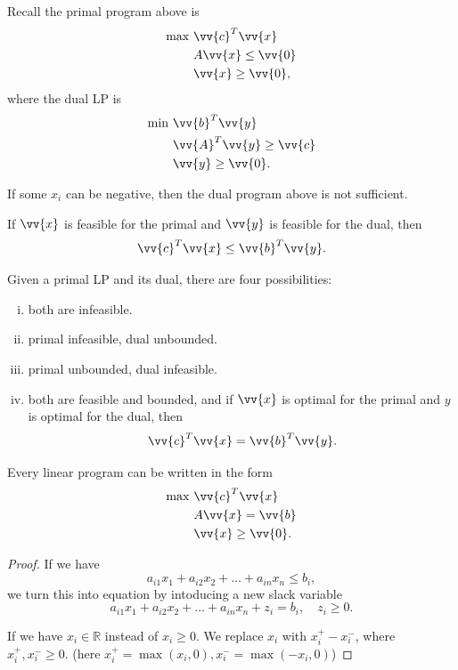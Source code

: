 
Recall the primal program above is 
\[
    \begin{aligned}
        \max~ & \vv{c}^T \vv{x}  \\
            & A \vv{x} \le \vv{0}  \\
            & \vv{x} \ge \vv{0},
    \end{aligned}
\]
where the dual LP is 
\[
    \begin{aligned}
        \min~ & \vv{b}^T \vv{y}  \\
            & \vv{A}^T \vv{y} \ge \vv{c}  \\
            & \vv{y} \ge \vv{0}.
    \end{aligned}
\]

\begin{remark}
    If some \(x_i\) can be negative, then the dual program above is not sufficient. 
\end{remark}

\begin{lemma}
    If \(\vv{x}\) is feasible for the primal and \(\vv{y}\) is feasible for the dual, then 
    \[
        \vv{c}^T \vv{x} \le \vv{b}^T \vv{y}.
    \]  
\end{lemma}

\begin{theorem}
    Given a primal LP and its dual, there are four possibilities:
    \begin{enumerate}[(i)]
        \item both are infeasible. 
        \item primal infeasible, dual unbounded. 
        \item primal unbounded, dual infeasible. 
        \item both are feasible and bounded, and if \(\vv{x}\) is optimal for the primal and \(y\) is optimal for the dual, then 
        \[
            \vv{c}^T \vv{x} = \vv{b}^T \vv{y}.
        \]
    \end{enumerate}
\end{theorem}

\begin{theorem}
    Every linear program can be written in the form 
    \[
        \begin{aligned}
            \max~ & \vv{c}^T \vv{x}  \\
                & A \vv{x} = \vv{b}  \\
                & \vv{x} \ge \vv{0}.
        \end{aligned}
    \]
\end{theorem}
\begin{proof}
    If we have 
    \[
        a_{i1} x_1 + a_{i2} x_2 + \dots + a_{in} x_n \le b_i,
    \]
    we turn this into equation by intoducing a new slack variable 
    \[
        a_{i1} x_1 + a_{i2} x_2 + \dots + a_{in} x_n + z_i = b_i, \quad z_i \ge 0.
    \]

    If we have \(x_i \in \mathbb{R}\) instead of \(x_i \ge 0\). We replace \(x_i\) with \(x_i^+ - x_i^-\), where \(x_i^+ , x_i^- \ge 0\). (here \(x_i^+ = \max (x_i, 0), x_i^- = \max (-x_i, 0)\))    
\end{proof}

